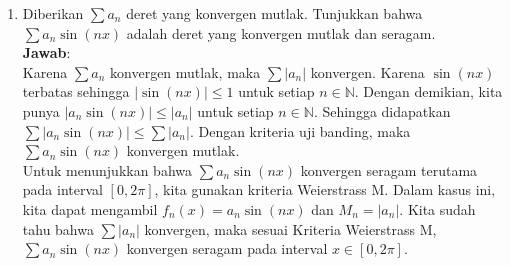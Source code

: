 \documentclass{article}
\newcommand{\jawab}{\textbf{Jawab}:}
\newcommand{\N}{\mathbb{N}}
\begin{document}
\begin{enumerate}
        \item Diberikan $\sum a_n$ deret yang konvergen mutlak. Tunjukkan bahwa $\sum a_n \sin(nx)$ adalah deret yang konvergen mutlak dan seragam.\\
        \jawab\\
        Karena $\sum a_n$ konvergen mutlak, maka $\sum |a_n|$ konvergen. Karena $\sin(nx)$ terbatas sehingga $|\sin(nx)|\leq 1$ untuk setiap $n\in\N$.
        Dengan demikian, kita punya $|a_n\sin(nx)|\leq |a_n|$ untuk setiap $n\in\N$. Sehingga didapatkan $\sum |a_n\sin(nx)|\leq \sum |a_n|$.
        Dengan kriteria uji banding, maka $\sum a_n\sin(nx)$ konvergen mutlak.\\
        Untuk menunjukkan bahwa $\sum a_n\sin(nx)$ konvergen seragam terutama pada interval $[0,2\pi]$, kita gunakan kriteria Weierstrass M. 
        Dalam kasus ini, kita dapat mengambil \(f_n(x) = a_n \sin(nx)\) dan \(M_n = |a_n|\). Kita sudah tahu bahwa \(\sum |a_n|\) konvergen, 
        maka sesuai Kriteria Weierstrass M, \(\sum a_n \sin(nx)\) konvergen seragam pada interval \(x \in [0, 2\pi]\).
    \end{enumerate}
\end{document}
